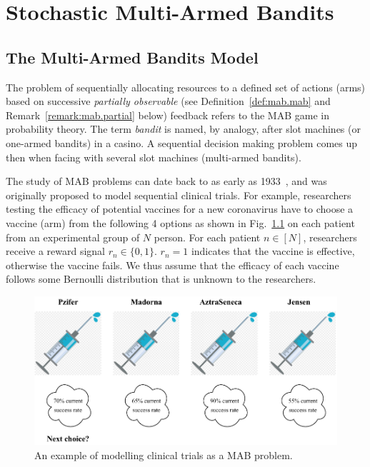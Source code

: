 \chapter{Stochastic Multi-Armed Bandits}\label{CHAP:MAB}
	\minitoc
	\newpage


\section{The Multi-Armed Bandits Model}\label{sec:mab.model}

The problem of sequentially allocating resources to a defined set of actions (arms) based on successive \emph{partially observable} (see Definition~\ref{def:mab.mab} and Remark~\ref{remark:mab.partial} below) feedback refers to the MAB game in probability theory. The term \emph{bandit} is named, by analogy, after slot machines (or one-armed bandits) in a casino. A sequential decision making problem comes up then when facing with several slot machines (multi-armed bandits).

The study of MAB problems can date back to as early as 1933~\citep{thompson1933}, and was originally proposed to model sequential clinical trials. For example, researchers testing the efficacy of potential vaccines for a new coronavirus have to choose a vaccine (arm) from the following 4 options as shown in Fig.~\ref{fig:mab.covid} on each patient from an experimental group of $N$ person. For each patient $n\in[N]$, researchers receive a reward signal $r_n\in\{0,1\}$. $r_n=1$ indicates that the vaccine is effective, otherwise the vaccine fails. We thus assume that the efficacy of each vaccine follows some Bernoulli distribution that is unknown to the researchers.

\begin{figure}[ht]
    \centering
    \includegraphics[width=\textwidth]{Chapter2/img/covid.pdf}
    \caption{An example of modelling clinical trials as a MAB problem.}
    \label{fig:mab.covid}
\end{figure}


